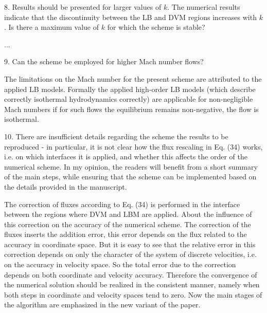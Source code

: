 \documentclass{article}
\begin{document}
\begin{leftbar}
\end{leftbar}

\begin{quoting}
    8. Results should be presented for larger values of
    $k$. The numerical results indicate that the
    discontinuity between the LB and DVM regions increases
    with $k$. Is there a maximum value of $k$ for which
    the scheme is stable?
\end{quoting}

...

\begin{leftbar}
\end{leftbar}

\begin{quoting}
    9. Can the scheme be employed for higher Mach number flows?
\end{quoting}

The limitations on the Mach number for the present scheme are attributed to the applied LB models.
Formally the applied high-order LB models (which describe correctly isothermal hydrodynamics correctly)
are applicable for non-negligible Mach numbers if for such flows the equilibrium remains non-negative,
the flow is isothermal.

\begin{leftbar}
\end{leftbar}

\begin{quoting}
    10. There are insufficient details regarding the scheme
    the results to be reproduced - in particular, it is not
    clear how the flux rescaling in Eq. (34) works, i.e. on
    which interfaces it is applied, and whether this affects
    the order of the numerical scheme. In my opinion, the
    readers will benefit from a short summary of the main
    steps, while ensuring that the scheme can be implemented
    based on the details provided in the manuscript.
\end{quoting}

The correction of fluxes according to Eq. (34) is performed in the interface
between the regions where DVM and LBM are applied.
About the influence of this correction on the accuracy of the numerical scheme.
The correction of the fluxes inserts the addition error,
this error depends on the flux related to the accuracy in coordinate space.
But it is easy to see that the relative error in this correction
depends on only the character of the system of discrete velocities,
i.e. on the accuracy in velocity space.
So the total error due to the correction depends on both coordinate and velocity accuracy.
Therefore the convergence of the numerical solution should be realized in the consistent manner,
namely when both steps in coordinate and velocity spaces tend to zero.
Now the main stages of the algorithm are emphasized in the new variant of the paper.
\end{document}
